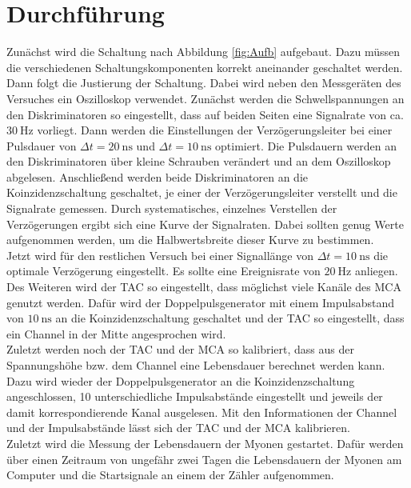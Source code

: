 \section{Durchführung}
	
	Zunächst wird die Schaltung nach Abbildung \ref{fig:Aufb} aufgebaut. 
    Dazu müssen die verschiedenen Schaltungskomponenten korrekt aneinander geschaltet werden.\\
	Dann folgt die Justierung der Schaltung. Dabei wird neben den Messgeräten des Versuches ein Oszilloskop verwendet.
	Zunächst werden die Schwellspannungen an den Diskriminatoren so eingestellt, dass auf beiden Seiten eine Signalrate von ca. $\SI{30}{\hertz}$ vorliegt. 
    Dann werden die Einstellungen der Verzögerungsleiter bei einer Pulsdauer von $\Delta t= \SI{20}{\nano\second}$ und $\Delta t= \SI{10}{\nano\second}$ optimiert.
	Die Pulsdauern werden an den Diskriminatoren über kleine Schrauben verändert und an dem Oszilloskop abgelesen.
	Anschließend werden beide Diskriminatoren an die Koinzidenzschaltung geschaltet, je einer der Verzögerungsleiter verstellt und die Signalrate gemessen.
	Durch systematisches, einzelnes Verstellen der Verzögerungen ergibt sich eine Kurve der Signalraten. 
    Dabei sollten genug Werte aufgenommen werden, um die Halbwertsbreite dieser Kurve zu bestimmen.\\
	Jetzt wird für den restlichen Versuch bei einer Signallänge von $\Delta t= \SI{10}{\nano\second}$ die optimale Verzögerung eingestellt.
    Es sollte eine Ereignisrate von $\SI{20}{\hertz}$ anliegen.\\
	Des Weiteren wird der TAC so eingestellt, dass möglichst viele Kanäle des MCA genutzt werden.
	Dafür wird der Doppelpulsgenerator mit einem Impulsabstand von $\SI{10}{\nano\second}$ an die Koinzidenzschaltung geschaltet und der TAC so eingestellt, dass ein Channel in der Mitte angesprochen wird.\\
	Zuletzt werden noch der TAC und der MCA so kalibriert, dass aus der Spannungshöhe bzw. dem Channel eine Lebensdauer berechnet werden kann.
	Dazu wird wieder der Doppelpulsgenerator an die Koinzidenzschaltung angeschlossen, 10 unterschiedliche Impulsabstände eingestellt und jeweils der damit korrespondierende Kanal ausgelesen.
	Mit den Informationen der Channel und der Impulsabstände lässt sich der TAC und der MCA kalibrieren.\\
    Zuletzt wird die Messung der Lebensdauern der Myonen gestartet. 
    Dafür werden über einen Zeitraum von ungefähr zwei Tagen die Lebensdauern der Myonen am Computer und die Startsignale an einem der Zähler aufgenommen.

